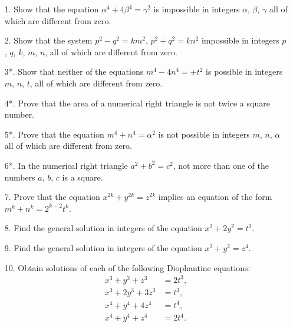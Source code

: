 \documentclass[oneside]{book}
\begin{document}
\begin{enumerate}
\item[1.] Show that the equation $\alpha^4 + 4\beta^4 = \gamma^2$ is
impossible in integers $\alpha$, $\beta$, $\gamma$ all of which are
different from zero.

\item[2.] Show that the system $p^2 - q^2 = km^2$, $p^2 + q^2 = kn^2$
impossible in integers $p$, $q$, $k$, $m$, $n$, all of which are
different from zero.

\item[3*.] Show that neither of the equations $m^4 - 4n^4 = \pm t^2$
is possible in integers $m$, $n$, $t$, all of which are different
from zero.

\item[4*.] Prove that the area of a numerical right triangle is not
twice a square number.

\item[5*.] Prove that the equation $m^4 + n^4 = \alpha^2$ is not
possible in integers $m$, $n$, $\alpha$ all of which are different
from zero.

\item[6*.] In the numerical right triangle $a^2 + b^2 = c^2$,
not more than one of the numbers $a$, $b$, $c$ is a square.

\item[7.] Prove that the equation $x^{2k} + y^{2k} = z^{2k}$ implies
an equation of the form $m^k + n^k = 2^{k-2} t^k$.

\item[8.] Find the general solution in integers of the equation
$x^2 + 2y^2 = t^2$.

\item[9.] Find the general solution in integers of the equation
$x^2 + y^2 = z^4$.

\item[10.] Obtain solutions of each of the following Diophantine
equations:
\begin{align*}
x^3 +  y^3 +  z^3 &= 2t^3, \\
x^3 + 2y^3 + 3z^3 &=  t^3, \\
x^4 +  y^4 + 4z^4 &=  t^4, \\
x^4 +  y^4 +  z^4 &= 2t^4.
\end{align*}
\end{enumerate}

\printindex


\newpage
\end{document}
